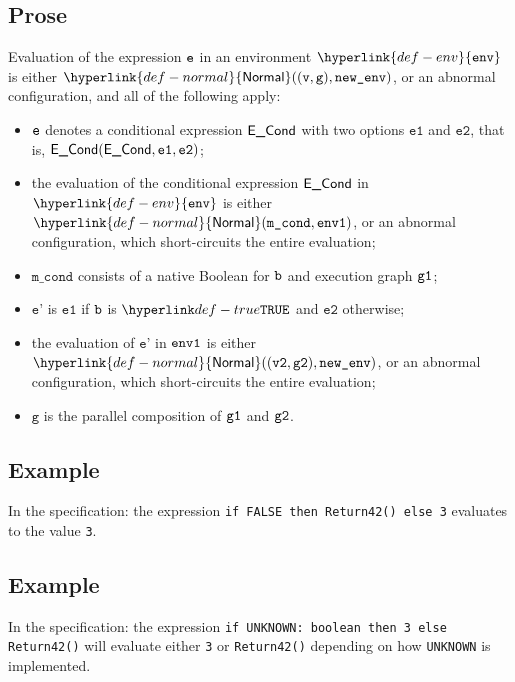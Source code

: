 \documentclass{book}
\newcommand\ProseOrAbnormal[0]{or an abnormal configuration, which short-circuits the entire evaluation}
\newcommand\Normal[0]{\hyperlink{def-normal}{\textsf{Normal}}}
\newcommand\env[0]{\hyperlink{def-env}{\texttt{env}}}
\newcommand\vg[0]{\texttt{g}}
\newcommand\vep[0]{\texttt{e'}}
\newcommand\vvtwo[0]{\texttt{v2}}
\newcommand\veone[0]{\texttt{e1}}
\newcommand\vetwo[0]{\texttt{e2}}
\newcommand\mcond[0]{\texttt{m\_cond}}
\newcommand\econd[0]{\ECond}
\begin{document}
  \subsection{Prose}
  Evaluation of the expression $\texttt{e}$ in an environment $\env$ is either $\Normal((\vv, \vg), \newenv)$,
  or an abnormal configuration, and all of the following apply:
  \begin{itemize}
    \item $\texttt{e}$ denotes a conditional expression $\econd$ with two options $\veone$ and $\vetwo$,
    that is, $\ECond(\econd, \veone, \vetwo)$;
    \item the evaluation of the conditional expression $\econd$ in $\env$ is either \\
    $\Normal(\mcond, \envone)$, \ProseOrAbnormal;
    \item $\mcond$ consists of a native Boolean for $\texttt{b}$ and execution graph $\texttt{g1}$;
    \item $\vep$ is $\veone$ if $\texttt{b}$ is $\True$ and $\vetwo$ otherwise;
    \item the evaluation of $\vep$ in $\texttt{env1}$ is either $\Normal((\vvtwo, \vgtwo), \newenv)$,
      \ProseOrAbnormal;
    \item $\vg$ is the parallel composition of $\texttt{g1}$ and $\texttt{g2}$.
  \end{itemize}

  \subsection{Example}
    In the specification:
    the expression \texttt{if FALSE then Return42() else 3} evaluates to the value \texttt{3}.

  \subsection{Example}
    In the specification:
the expression \texttt{if UNKNOWN: boolean then 3 else Return42()} will
evaluate either \texttt{3} or \texttt{Return42()} depending on how
\texttt{UNKNOWN} is implemented.


\end{document}
